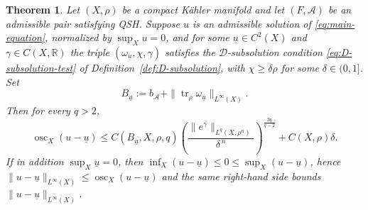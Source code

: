 \documentclass[oneside,english,letterpaper]{amsart}
\numberwithin{equation}{section}
\theoremstyle{plain}
\newtheorem{thm}{Theorem}[section]
\theoremstyle{definition}
\theoremstyle{remark}
\begin{document}
\begin{thm} \label{thm:ABP-explicit-delta} Let $(X,\rho)$ be a compact K\"ahler manifold and let $(F,\mathcal A)$ be an admissible pair satisfying QSH. Suppose $u$ is an admissible solution of \eqref{eq:main-equation}, normalized by $\sup_Xu=0$, and for some $\underline{u} \in C^2(X)$ and $\gamma\in C(X,\mathbb R)$ the triple $(\omega_{\underline u},\chi,\gamma)$ satisfies the $\mathcal D$-subsolution condition \eqref{eq:D-subsolution-test} of Definition~\ref{def:D-subsolution}, with $\chi\ge \delta\rho$ for some $\delta\in(0,1]$. Set
	\[
		B_{\underline u}:=b_{\mathcal A}
		+\|\operatorname{tr}_\rho\omega_{\underline u}\|_{L^\infty(X)}.
	\]
	Then for every $q>2$,
	\[
		\operatorname{osc}_X(u-\underline u)
		\le C(B_{\underline u},X,\rho,q)
		\left(\frac{\|e^\gamma\|_{L^q(X,\rho^n)}}{\delta^{\,n}}\right)^{\frac{2q}{q-2}}
		+C(X,\rho)\delta.
	\]
	If in addition $\sup_X\underline u=0$, then
	$\inf_X(u-\underline u)\le0\le\sup_X(u-\underline u)$, hence
	$\|u-\underline u\|_{L^\infty(X)}\le\operatorname{osc}_X(u-\underline u)$
	and the same right-hand side bounds $\|u-\underline u\|_{L^\infty(X)}$.
\end{thm}
\end{document}
